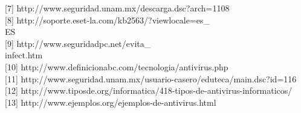 \documentclass[12pt,a4paper]{article}
\begin{document}
	[7]  http://www.seguridad.unam.mx/descarga.dsc?arch=1108 \\
	
	[8]  http://soporte.eset-la.com/kb2563/?viewlocale=es\_ \\ES \\
	
	[9]  http://www.seguridadpc.net/evita\_ \\infect.htm \\
	
	[10] http://www.definicionabc.com/tecnologia/antivirus.php \\
	
	[11] http://www.seguridad.unam.mx/usuario-casero/eduteca/main.dsc?id=116 \\
	
	[12] http://www.tiposde.org/informatica/418-tipos-de-antivirus-informaticos/ \\
	
	[13] http://www.ejemplos.org/ejemplos-de-antivirus.html
	
\end{document}
